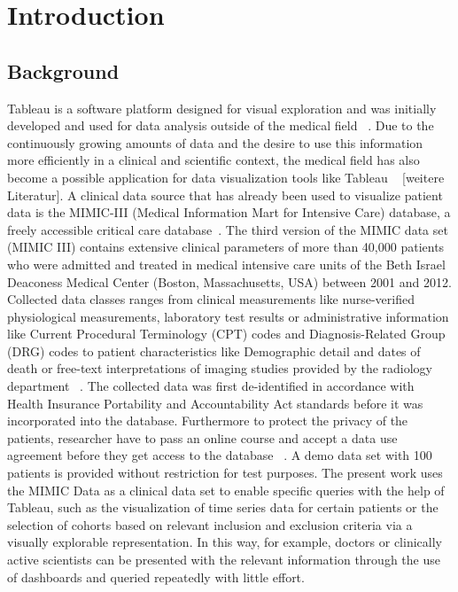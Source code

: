 \documentclass[aac,crcready]{iosart2x}
\begin{document}
\begin{frontmatter}
\begin{keyword}
\end{keyword}

\end{frontmatter}


\section{Introduction}\label{s1}

\subsection{Background}\label{s1.1}
%
Tableau is a software platform designed for visual exploration and was initially developed and used for data analysis outside of the medical field ~\cite{Tableau.2021}. Due to the continuously growing amounts of data and the desire to use this information more efficiently in a clinical and scientific context, the medical field has also become a possible application for data visualization tools like Tableau ~\cite{Ko.2017} [weitere Literatur]. 
A clinical data source that has already been used to visualize patient data is the MIMIC-III (Medical Information Mart for Intensive Care) database, a freely accessible critical care database~\cite{Festag.2019,Lee.2016,Johnson.2020,Johnson.2016}. The third version of the MIMIC data set (MIMIC III) contains extensive clinical parameters of more than 40,000 patients who were admitted and treated in medical intensive care units of the Beth Israel Deaconess Medical Center (Boston, Massachusetts, USA) between 2001 and 2012. Collected data classes ranges from clinical measurements like nurse-verified physiological measurements, laboratory test results or administrative information like Current Procedural Terminology (CPT) codes and Diagnosis-Related Group (DRG) codes to patient characteristics like Demographic detail and dates of death or free-text interpretations of imaging studies provided by the radiology department ~\cite{Johnson.2020,Johnson.2016}. The collected data was first de-identified in accordance with Health Insurance Portability and Accountability Act standards before it was incorporated into the database. Furthermore to protect the privacy of the patients, researcher have to pass an online course and accept a data use agreement before they get access to the database ~\cite{Johnson.2020,Johnson.2016}. A demo data set with 100 patients is provided without restriction for test purposes. 
The present work uses the MIMIC Data as a clinical data set to enable specific queries with the help of Tableau, such as the visualization of time series data for certain patients or the selection of cohorts based on relevant inclusion and exclusion criteria via a visually explorable representation. In this way, for example, doctors or clinically active scientists can be presented with the relevant information through the use of dashboards and queried repeatedly with little effort.
\end{document}
